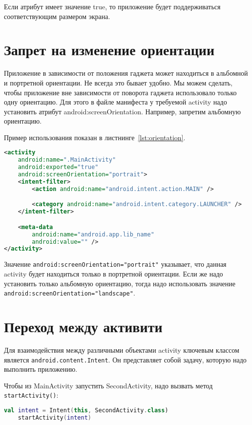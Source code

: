 Если атрибут имеет значение true, то приложение будет поддерживаться
соответствующим размером экрана.

\section{Запрет на изменение ориентации}
Приложение в зависимости от положения гаджета может находиться в
альбомной и портретной ориентации. Не всегда это бывает удобно. Мы
можем сделать, чтобы приложение вне зависимости от поворота гаджета
использовало только одну ориентацию. Для этого в файле манифеста у
требуемой activity надо установить атрибут android:screenOrientation.
Например, запретим альбомную ориентацию.\par
Пример использования показан в листнинге~\ref{lst:orientation}.

\begin{lstlisting}[language=XML
	, caption=\leftline{}
	, label=lst:orientation
	]
<activity
	android:name=".MainActivity"
	android:exported="true"
	android:screenOrientation="portrait">
	<intent-filter>
		<action android:name="android.intent.action.MAIN" />

		<category android:name="android.intent.category.LAUNCHER" />
	</intent-filter>

	<meta-data
		android:name="android.app.lib_name"
		android:value="" />
</activity>
\end{lstlisting}

Значение \texttt{android:screenOrientation="portrait"} указывает,
что данная activity будет находиться только в портретной ориентации.
Если же надо установить только альбомную ориентацию, тогда надо использовать
значение \texttt{android:screenOrientation="landscape"}.

\section{Переход между активити}
Для взаимодействия между различными объектами activity ключевым
классом является \texttt{android.content.Intent}. Он представляет собой
задачу, которую надо выполнить приложению.\par
Чтобы из MainActivity запустить SecondActivity, надо вызвать метод
\texttt{startActivity()}:
\begin{lstlisting}[language=Kotlin, caption=\leftline{},label={lst:intentex}]
	val intent = Intent(this, SecondActivity.class)
	startActivity(intent)
\end{lstlisting}

